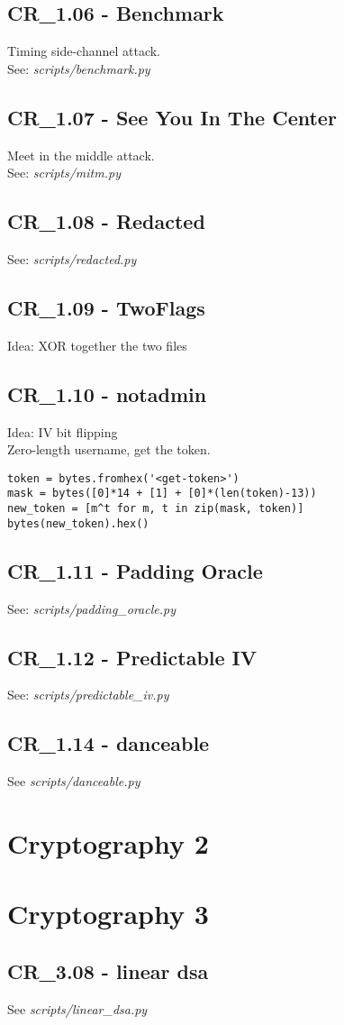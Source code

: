 \subsection{CR_1.06 - Benchmark}
Timing side-channel attack. \\
See: \textit{scripts/benchmark.py}

\subsection{CR_1.07 - See You In The Center}
Meet in the middle attack. \\
See: \textit{scripts/mitm.py}

\subsection{CR_1.08 - Redacted}
See: \textit{scripts/redacted.py}

\subsection{CR_1.09 - TwoFlags}
Idea: XOR together the two files

\subsection{CR_1.10 - notadmin}
Idea: IV bit flipping \\

Zero-length username, get the token.
\begin{verbatim}
token = bytes.fromhex('<get-token>')
mask = bytes([0]*14 + [1] + [0]*(len(token)-13))
new_token = [m^t for m, t in zip(mask, token)]
bytes(new_token).hex()
\end{verbatim}

\subsection{CR_1.11 - Padding Oracle}
See: \textit{scripts/padding_oracle.py}

\subsection{CR_1.12 - Predictable IV}
See: \textit{scripts/predictable_iv.py}

\subsection{CR_1.14 - danceable}
See \textit{scripts/danceable.py}

\section{Cryptography 2}

\section{Cryptography 3}
\subsection{CR_3.08 - linear dsa}
See \textit{scripts/linear_dsa.py}